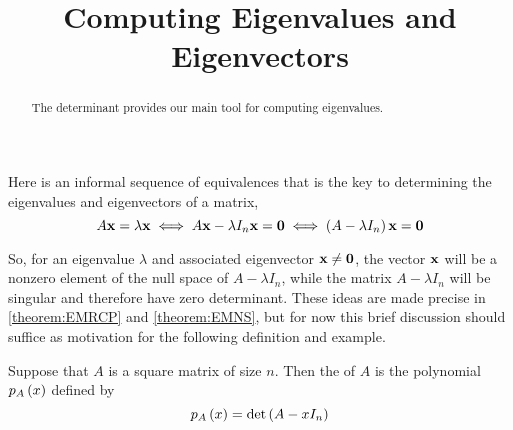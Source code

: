 \documentclass{ximera}
\title{Computing Eigenvalues and Eigenvectors}
\begin{document}
\begin{abstract}
  The determinant provides our main tool for computing eigenvalues.
\end{abstract}
\maketitle

Here is an informal sequence of equivalences that is the key to determining the eigenvalues and eigenvectors of a matrix,
\[
  A\mathbf{x}=\lambda\mathbf{x}\iff
  A\mathbf{x}-\lambda I_n\mathbf{x}=\mathbf{0}\iff
  \left(A-\lambda I_n\right)\mathbf{x}=\mathbf{0}
\]

So, for an eigenvalue $\lambda$ and associated eigenvector
$\mathbf{x}\neq\mathbf{0}$, the vector $\mathbf{x}$ will be a nonzero
element of the null space of $A-\lambda I_n$, while the matrix
$A-\lambda I_n$ will be singular and therefore have zero determinant.
These ideas are made precise in \ref{theorem:EMRCP} and
\ref{theorem:EMNS}, but for now this brief discussion should suffice
as motivation for the following definition and example.

\begin{definition}

  Suppose that $A$ is a square matrix of size $n$.  Then the
   of $A$ is the polynomial
  $p_{A}\left(x\right)$ defined by
  \[
    p_{A}\left(x\right)=\det\left(A-xI_n\right)
  \]

\end{definition}
\end{document}
